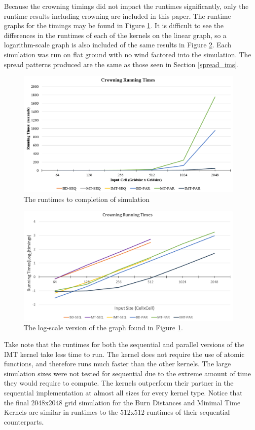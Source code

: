 Because the crowning timings did not impact the runtimes significantly, only the runtime results including crowning are included in this paper. The runtime graphs for the timings may be found in Figure \ref{fig:runtimes}. It is difficult to see the differences in the runtimes of each of the kernels on the linear graph, so a logarithm-scale graph is also included of the same results in Figure \ref{fig:runtimes_log}. Each simulation was run on flat ground with no wind factored into the simulation. The spread patterns produced are the same as those seen in Section \ref{spread_ims}. 
\begin{figure}%
\centering
  \includegraphics[width=\textwidth]{figures/results/crowning_reg.png}
  \caption{The runtimes to completion of simulation }
  \label{fig:runtimes}
\end{figure}  
\begin{figure}%
\centering
  \includegraphics[width=\textwidth]{figures/results/crowning_log.png}
  \caption{The log-scale version of the graph found in Figure \ref{fig:runtimes}.}
  \label{fig:runtimes_log}
\end{figure} 

Take note that the runtimes for both the sequential and parallel versions of the IMT kernel take less time to run. The kernel does not require the use of atomic functions, and therefore runs much faster than the other kernels. The large simulation sizes were not tested for sequential due to the extreme amount of time they would require to compute. The kernels outperform their partner in the sequential implementation at almost all sizes for every kernel type. Notice that the final 2048x2048 grid simulation for the Burn Distances and Minimal Time Kernels are similar in runtimes to the 512x512 runtimes of their sequential counterparts. 

